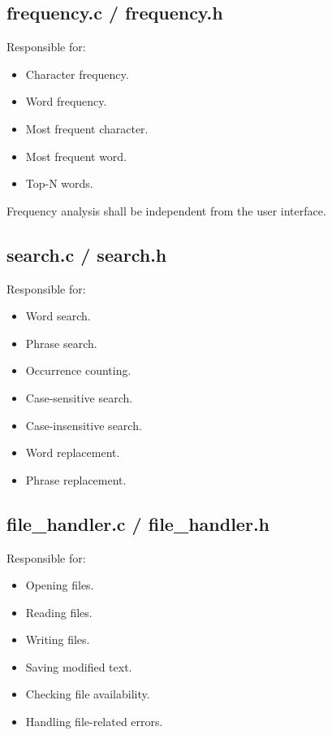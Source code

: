 \documentclass[12pt,a4paper]{article}
\begin{document}
\subsection{frequency.c / frequency.h}

Responsible for:

\begin{itemize}
    \item Character frequency.
    \item Word frequency.
    \item Most frequent character.
    \item Most frequent word.
    \item Top-N words.
\end{itemize}

Frequency analysis shall be independent from the user interface.

\subsection{search.c / search.h}

Responsible for:

\begin{itemize}
    \item Word search.
    \item Phrase search.
    \item Occurrence counting.
    \item Case-sensitive search.
    \item Case-insensitive search.
    \item Word replacement.
    \item Phrase replacement.
\end{itemize}

\subsection{file\_handler.c / file\_handler.h}

Responsible for:

\begin{itemize}
    \item Opening files.
    \item Reading files.
    \item Writing files.
    \item Saving modified text.
    \item Checking file availability.
    \item Handling file-related errors.
\end{itemize}
\end{document}
